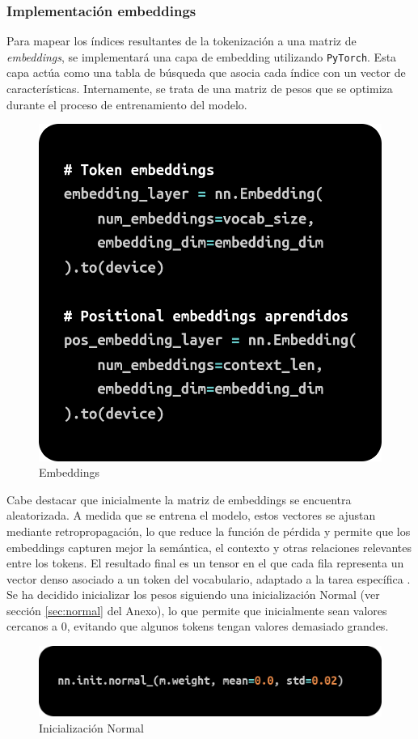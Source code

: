 \documentclass[11pt]{book}
\begin{document}
\subsubsection{Implementación embeddings}
Para mapear los índices resultantes de la tokenización a una matriz de \textit{embeddings}, se implementará una capa de embedding utilizando \texttt{PyTorch}. Esta capa actúa como una tabla de búsqueda que asocia cada índice con un vector de características. Internamente, se trata de una matriz de pesos que se optimiza durante el proceso de entrenamiento del modelo.

\begin{figure}[h]
    \centering
    \includegraphics[width=0.5\linewidth]{img/embeddings1.png}
    \caption{Embeddings}
    \label{fig:placeholder17}
\end{figure}

Cabe destacar que inicialmente la matriz de embeddings se encuentra aleatorizada. A medida que se entrena el modelo, estos vectores se ajustan mediante retropropagación, lo que reduce la función de pérdida y permite que los embeddings capturen mejor la semántica, el contexto y otras relaciones relevantes entre los tokens. El resultado final es un tensor en el que cada fila representa un vector denso asociado a un token del vocabulario, adaptado a la tarea específica \parencite{bao2022embedding}. Se ha decidido inicializar los pesos siguiendo una inicialización Normal (ver sección \ref{sec:normal} del Anexo), lo que permite que inicialmente sean valores cercanos a 0, evitando que algunos tokens tengan valores demasiado grandes. 

\begin{figure}[h]
    \centering
    \includegraphics[width=0.5\linewidth]{img/normal_init.png}
    \caption{Inicialización Normal}
    \label{fig:placeholder18}
\end{figure}
\end{document}
